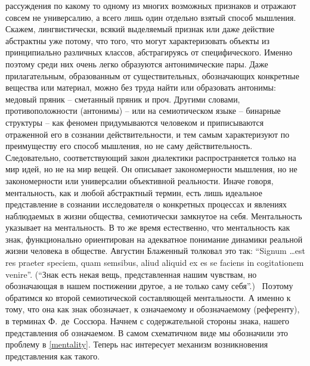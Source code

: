рассуждения по какому то одному из многих возможных признаков и отражают совсем не универсалию,
а всего лишь один отдельно взятый способ мышления. Скажем, лингвистически, всякий выделяемый
признак или даже действие абстрактны уже потому, что того, что могут характеризовать объекты
из принципиально различных классов, абстрагируясь от специфического. Именно поэтому среди них
очень легко образуются антонимические пары. Даже прилагательным, образованным от существительных,
обозначающих конкретные вещества или материал, можно без труда найти или образовать антонимы:
медовый пряник -- сметанный пряник и проч. Другими словами, противоположности (антонимы) --
или на семиотическом языке -- бинарные структуры -- как феномен придумываются
человеком и приписываются отраженной его в сознании действительности, и тем самым
характеризуют по преимуществу его способ мышления, но не саму действительность.
Следовательно, соответствующий закон диалектики распространяется только на мир идей,
но не на мир вещей. Он описывает закономерности мышления, но не закономерности или универсалии
объективной реальности. Иначе говоря, ментальность, как и любой абстрактный термин,
есть лишь идеальное представление в сознании исследователя о конкретных процессах и
явлениях наблюдаемых в жизни общества, семиотически замкнутое на себя. Ментальность
указывает на ментальность. В то же время естественно, что ментальность как знак,
функционально ориентирован на адекватное понимание динамики реальной жизни человека в обществе.
Августин Блаженный толковал это так: ``Signum \ldots est res praeter speciem, quam semsibus,
aliud aliquid ex es se faciens in cogitationem venire''. (``Знак есть некая вещь, представленная
нашим чувствам, но обозначающая в нашем постижении другое, а не только саму себя''.)~\autocite{gorny}
Поэтому обратимся ко второй семиотической составляющей ментальности. А именно к тому,
что она как знак обозначает, к означаемому и обозначаемому (референту), в терминах
Ф.~де~Соссюра. Начнем с содержательной стороны знака, нашего представления об означаемом.
В самом схематичном виде мы обозначили это проблему в \ref{mentality}.
Теперь нас интересует механизм возникновения представления как такого.

